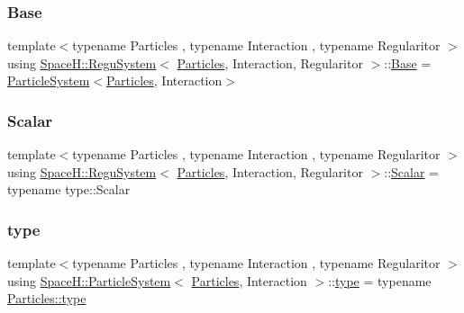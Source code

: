 \subsubsection{\texorpdfstring{Base}{Base}}
{\footnotesize\ttfamily template$<$typename Particles , typename Interaction , typename Regularitor $>$ \\
using \mbox{\hyperlink{class_space_h_1_1_regu_system}{Space\+H\+::\+Regu\+System}}$<$ \mbox{\hyperlink{struct_space_h_1_1_particles}{Particles}}, Interaction, Regularitor $>$\+::\mbox{\hyperlink{class_space_h_1_1_regu_system_ad65166badb7cec65669212f7b61489a6}{Base}} =  \mbox{\hyperlink{class_space_h_1_1_particle_system}{Particle\+System}}$<$\mbox{\hyperlink{struct_space_h_1_1_particles}{Particles}}, Interaction$>$}

\mbox{\label{class_space_h_1_1_regu_system_a6f6c4d4fd030a85621a78b137c0ac889}} 
\subsubsection{\texorpdfstring{Scalar}{Scalar}}
{\footnotesize\ttfamily template$<$typename Particles , typename Interaction , typename Regularitor $>$ \\
using \mbox{\hyperlink{class_space_h_1_1_regu_system}{Space\+H\+::\+Regu\+System}}$<$ \mbox{\hyperlink{struct_space_h_1_1_particles}{Particles}}, Interaction, Regularitor $>$\+::\mbox{\hyperlink{class_space_h_1_1_regu_system_a6f6c4d4fd030a85621a78b137c0ac889}{Scalar}} =  typename type\+::\+Scalar}

\mbox{\label{class_space_h_1_1_regu_system_a21376735739dfbe668a70cdba008baa3}} 
\subsubsection{\texorpdfstring{type}{type}}
{\footnotesize\ttfamily template$<$typename Particles , typename Interaction , typename Regularitor $>$ \\
using \mbox{\hyperlink{class_space_h_1_1_particle_system}{Space\+H\+::\+Particle\+System}}$<$ \mbox{\hyperlink{struct_space_h_1_1_particles}{Particles}}, Interaction $>$\+::\mbox{\hyperlink{class_space_h_1_1_particle_system_a21376735739dfbe668a70cdba008baa3}{type}} =  typename \mbox{\hyperlink{class_space_h_1_1_vel_indep_particles_a09aa167b5fb1b203ab021220601ed74c}{Particles\+::type}}}


